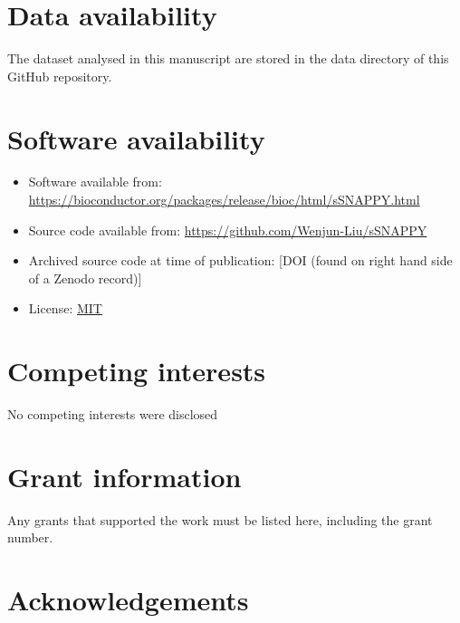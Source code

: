 \documentclass[9pt,a4paper,]{extarticle}
\begin{document}
\hypertarget{data-availability}{%
\section{Data availability}\label{data-availability}}

The dataset analysed in this manuscript are stored in the data directory of this GitHub repository.

\hypertarget{software-availability}{%
\section{Software availability}\label{software-availability}}

\begin{itemize}
\item
  Software available from: \url{https://bioconductor.org/packages/release/bioc/html/sSNAPPY.html}
\item
  Source code available from: \url{https://github.com/Wenjun-Liu/sSNAPPY}
\item
  Archived source code at time of publication: {[}DOI (found on right hand side of a Zenodo record){]}
\item
  License: \href{https://opensource.org/license/mit/}{MIT}
\end{itemize}

\hypertarget{competing-interests}{%
\section{Competing interests}\label{competing-interests}}

No competing interests were disclosed

\hypertarget{grant-information}{%
\section{Grant information}\label{grant-information}}

Any grants that supported the work must be listed here, including the grant number.

\hypertarget{acknowledgements}{%
\section{Acknowledgements}\label{acknowledgements}}

\renewcommand\refname{References}
{\small}
\end{document}
